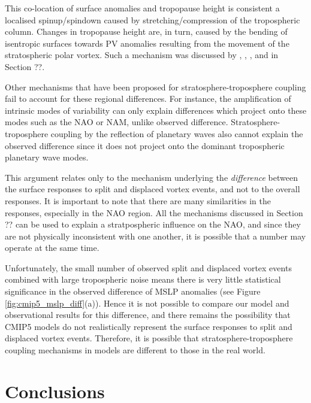 This co-location of surface anomalies and tropopause height is consistent a
localised spinup/spindown caused by stretching/compression of the tropospheric
column. Changes in tropopause height are, in turn, caused by the bending of
isentropic surfaces towards PV anomalies resulting from the movement of the
stratospheric polar vortex. Such a mechanism was discussed by
\citet{Hartley1998}, \citet{Ambaum2002}, \citet{Black2002}, and in Section
??.  

Other mechanisms that have been proposed for stratosphere-troposphere coupling
fail to account for these regional differences. For instance, the amplification
of intrinsic modes of variability \citep{Robinson1991} can only explain
differences which project onto these modes such as the NAO or NAM, unlike
observed difference. Stratosphere-troposphere coupling by the reflection of
planetary waves \citep{JudithPerlwitz2003,Shaw2010} also cannot explain the
observed difference since it  does not project onto the dominant tropospheric
planetary wave modes. 

This argument relates only to the mechanism underlying the \emph{difference}
between the surface responses to split and displaced vortex events, and not to
the overall responses. It is important to note that there are many similarities
in the responses, especially in the NAO region. All the mechanisms discussed in
Section ?? can be used to explain a stratpospheric influence on the NAO, and
since they are not physically inconsistent with one another, it is possible that
a number may operate at the same time. 

Unfortunately, the small number of observed split and displaced vortex events
combined with large tropospheric noise means there is very little statistical
significance in the observed difference of MSLP anomalies (see Figure
\ref{fig:cmip5_mslp_diff}(a)). Hence it is not possible to compare our model and
observational results for this difference, and there remains the
possibility that CMIP5 models do not realistically represent the surface
responses to split and displaced vortex events. Therefore, it is possible that
stratosphere-troposphere coupling mechanisms in models are different to those in
the real world. 

\section{Conclusions}

